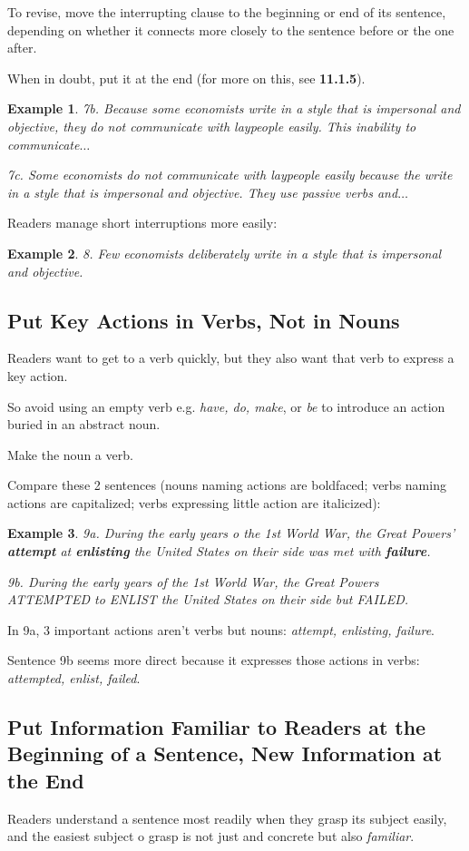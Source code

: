 \documentclass[oneside]{book}
\numberwithin{equation}{section}
\newtheorem{example}{Example}[section]
\begin{document}
To revise, move the interrupting clause to the beginning or end of its sentence, depending on whether it connects more closely to the sentence before or the one after.

When in doubt, put it at the end (for more on this, see \textbf{11.1.5}).
\begin{example}
    7b. Because some economists write in a style that is impersonal and objective, they do not communicate with laypeople easily. This inability to communicate$\ldots$
    
    7c. Some economists do not communicate with laypeople easily because the write in a style that is impersonal and objective. They use passive verbs and$\ldots$
\end{example}
Readers manage short interruptions more easily:
\begin{example}
    8. Few economists \emph{deliberately} write in a style that is impersonal and objective.
\end{example}

\subsection{Put Key Actions in Verbs, Not in Nouns}
Readers want to get to a verb quickly, but they also want that verb to express a key action.

So avoid using an empty verb e.g. \textit{have, do, make}, or \textit{be} to introduce an action buried in an abstract noun.

Make the noun a verb.

%
Compare these 2 sentences (nouns naming actions are boldfaced; verbs naming actions are capitalized; verbs expressing little action are italicized):
\begin{example}
    \emph{9a. During the early years o the 1st World War, the Great Powers' \textbf{attempt} at \textbf{enlisting} the United States on their side} was met \emph{with \textbf{failure}}.
    
    \emph{9b. During the early years of the 1st World War, the Great Powers ATTEMPTED to ENLIST the United States on their side but FAILED.}
\end{example}
In 9a, 3 important actions aren't verbs but nouns: \textit{attempt, enlisting, failure}.

Sentence 9b seems more direct because it expresses those actions in verbs: \textit{attempted, enlist, failed}.

\subsection{Put Information Familiar to Readers at the Beginning of a Sentence, New Information at the End}
Readers understand a sentence most readily when they grasp its subject easily, and the easiest subject o grasp is not just and concrete but also \textit{familiar}.
\end{document}
